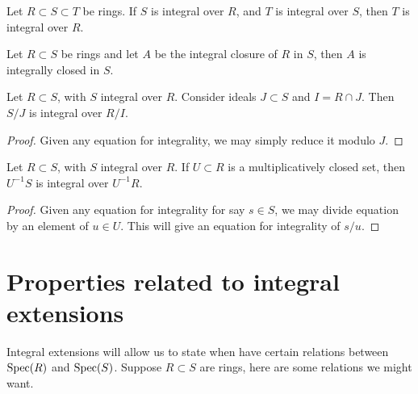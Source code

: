 \documentclass{ximera}
\begin{document}
\begin{corollary}
  Let $R\subset S \subset T$ be rings. If $S$ is integral over $R$,
  and $T$ is integral over $S$, then $T$ is integral over $R$.
\end{corollary}


\begin{corollary}
  Let $R\subset S$ be rings and let $A$ be the integral closure of $R$
  in $S$, then $A$ is integrally closed in $S$.
\end{corollary}




\begin{proposition}
  Let $R\subset S$, with $S$ integral over $R$. Consider ideals
  $J\subset S$ and $I= R\cap J$. Then $S/J$ is integral over $R/I$.
  \begin{proof}
    Given any equation for integrality, we may simply reduce it modulo
    $J$.
  \end{proof}
\end{proposition}

\begin{proposition}\label{P:localint}
  Let $R\subset S$, with $S$ integral over $R$. If $U\subset R$ is a
  multiplicatively closed set, then $U^{-1} S$ is integral over
  $U^{-1} R$.
  \begin{proof}
    Given any equation for integrality for say $s\in S$, we may divide
    equation by an element of $u\in U$. This will give an equation for
    integrality of $s/u$.
  \end{proof}
\end{proposition}



\section{Properties related to integral extensions}


Integral extensions will allow us to state when have certain relations
between $\operatorname{Spec}(R)$ and $\operatorname{Spec}(S)$. Suppose $R\subset S$ are rings,
here are some relations we might want.
\end{document}
